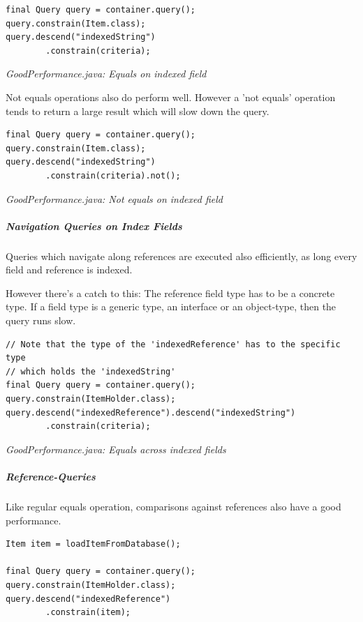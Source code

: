 \begin{lstlisting}
final Query query = container.query();
query.constrain(Item.class);
query.descend("indexedString")
        .constrain(criteria);
\end{lstlisting}

{\small\itshape GoodPerformance.java: Equals on indexed field\par}
\medskip

Not equals operations also do perform well. However a 'not equals' operation tends to return a large result which will slow down the query.

\begin{lstlisting}
final Query query = container.query();
query.constrain(Item.class);
query.descend("indexedString")
        .constrain(criteria).not();
\end{lstlisting}

{\small\itshape GoodPerformance.java: Not equals on indexed field\par}
\medskip

\subparagraph*{Navigation Queries on Index Fields}

Queries which navigate along references are executed also efficiently, as long every field and reference is indexed.

However there's a catch to this: The reference field type has to be a concrete type. If a field type is a generic type, an interface or an object-type, then the query runs slow.

\begin{lstlisting}
// Note that the type of the 'indexedReference' has to the specific type
// which holds the 'indexedString'
final Query query = container.query();
query.constrain(ItemHolder.class);
query.descend("indexedReference").descend("indexedString")
        .constrain(criteria);
\end{lstlisting}

{\small\itshape GoodPerformance.java: Equals across indexed fields\par}
\medskip

\subparagraph*{Reference-Queries}

Like regular equals operation, comparisons against references also have a good performance.

\begin{lstlisting}
Item item = loadItemFromDatabase();

final Query query = container.query();
query.constrain(ItemHolder.class);
query.descend("indexedReference")
        .constrain(item);
\end{lstlisting}

